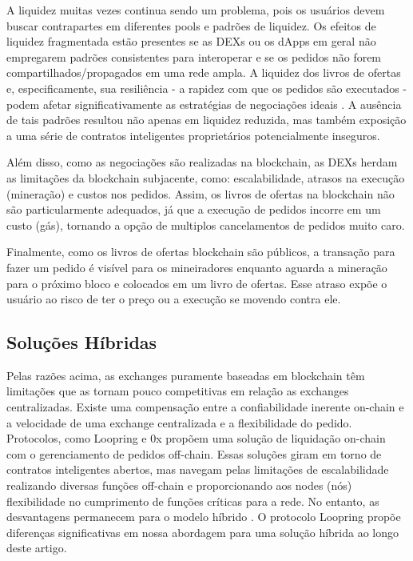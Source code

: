 \documentclass[UTF8,nofonts]{article}
\begin{document}
\begin{multicols}{2}
A liquidez muitas vezes continua sendo um problema, pois os usuários devem buscar contrapartes em diferentes pools e padrões de liquidez. Os efeitos de liquidez fragmentada estão presentes se as DEXs ou os dApps em geral não empregarem padrões consistentes para interoperar e se os pedidos não forem compartilhados/propagados em uma rede ampla. A liquidez dos livros de ofertas e, especificamente, sua resiliência - a rapidez com que os pedidos são executados - podem afetar significativamente as estratégias de negociações ideais \cite{limitorderliquidity}. A ausência de tais padrões resultou não apenas em liquidez reduzida, mas também exposição a uma série de contratos inteligentes proprietários potencialmente inseguros.

Além disso, como as negociações são realizadas na blockchain, as DEXs herdam as limitações da blockchain subjacente, como: escalabilidade, atrasos na execução (mineração) e custos nos pedidos. Assim, os livros de ofertas na blockchain não são particularmente adequados, já que a execução de pedidos incorre em um custo (gás), tornando a opção de multiplos cancelamentos de pedidos muito caro. 

Finalmente, como os livros de ofertas blockchain são públicos, a transação para fazer um pedido é visível para os mineiradores enquanto aguarda a mineração para o próximo bloco e colocados em um livro de ofertas. Esse atraso expõe o usuário ao risco de ter o preço ou a execução se movendo contra ele.

\subsection{Soluções Híbridas}
Pelas razões acima, as exchanges puramente baseadas em blockchain têm limitações que as tornam pouco competitivas em relação as exchanges centralizadas. Existe uma compensação entre a confiabilidade inerente on-chain e a velocidade de uma exchange centralizada e a flexibilidade do pedido. Protocolos, como Loopring e 0x \cite{warren20170x} propõem uma solução de liquidação on-chain com o gerenciamento de pedidos off-chain. Essas soluções giram em torno de contratos inteligentes abertos, mas navegam pelas limitações de escalabilidade realizando diversas funções off-chain e proporcionando aos nodes (nós) flexibilidade no cumprimento de funções críticas para a rede. No entanto, as desvantagens permanecem para o modelo híbrido \cite{costofdecent}. O protocolo Loopring propõe diferenças significativas em nossa abordagem para uma solução híbrida ao longo deste artigo.



\end{multicols}
\end{document}

